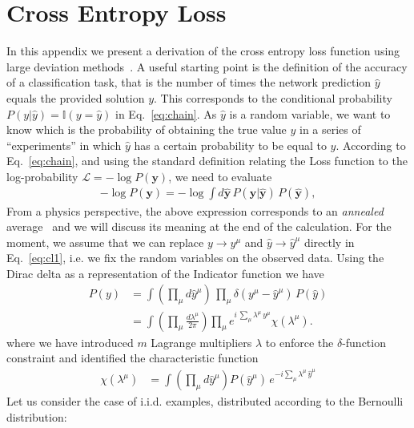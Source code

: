 \documentclass[5p]{elsarticle}
\begin{document}
\section{Cross Entropy Loss} \label{a:loss}
%
In this appendix we present a derivation of the cross entropy loss function using large deviation methods~\cite{mezard}. A useful starting point is the definition of the accuracy of a classification task, that is the number of times the network prediction $\hat{y}$ equals the provided solution $y$. This corresponds to the conditional probability $P(y|\hat{y}) =  \mathbb{I}(y = \hat{y})$ in Eq.~\eqref{eq:chain}.  As $\hat{y}$ is a random variable, we want to know which is the probability of obtaining the true value $y$ in a series of ``experiments'' in which $\hat{y}$  has a certain probability to be equal to $y$. According to Eq.~\eqref{eq:chain}, and using the standard definition  relating the Loss function to the log-probability $\mathscr{L} = - \log P(\mathbf{y})$, we need to evaluate
%
 \begin{align} \label{eq:cl1}
-\log P(\mathbf{y}) = - \log \int d \hat{\mathbf{y}}\, P(\mathbf{y} | \hat{\mathbf{y}}) \, P(\hat{\mathbf{y}}),
 \end{align}
%
From a physics perspective, the above expression corresponds to an {\it annealed } average~\cite{parisi2, giardina} and we will discuss its meaning at the end of the calculation. For the moment, we assume that we can replace $y \to y^{\mu}$ and $\hat{y} \to \hat{y}^{\mu}$ directly in Eq.~\eqref{eq:cl1}, i.e. we fix the random variables on the observed data. Using the Dirac delta  as a representation of the Indicator function we have
%
 \begin{align} \label{eq:cl1}
 P(y) & =  \int  \left( \prod_{\mu} d \hat{y}^{\mu} \right)  \,  \prod_{\mu} \delta( y^{\mu} - \hat{y}^{\mu})  \, P(\hat{y})\\ \nonumber
 &=  \int  \left( \prod_{\mu}  \frac{d\lambda^{\mu}}{2\pi} \right) \prod_{\mu}  e^{i \, \sum_{\mu} \lambda^{\mu} \, y^{\mu} } \chi(\lambda^{\mu}).
  \end{align}
%
where we have introduced $m$ Lagrange multipliers $\lambda$ to enforce the $\delta$-function constraint and identified  the characteristic function
%
\begin{align} \label{eq:char}
 \chi(\lambda^{\mu}) &=  \int  \left( \prod_{\mu} d\hat{y}^{\mu} \right)  P(\hat{y}^{\mu} )  \, e^{-i \sum_{\mu} \lambda^{\mu} \, \hat{y}^{\mu}}
 \end{align}
%
Let us consider the case of i.i.d. examples, distributed according to the Bernoulli distribution:
\end{document}
